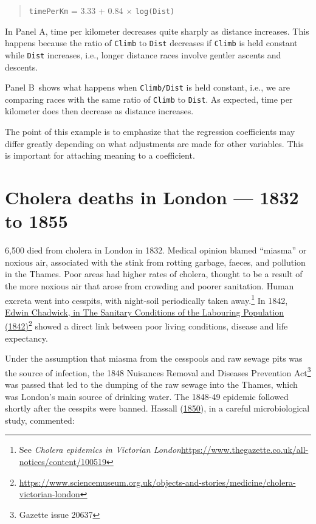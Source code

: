 \documentclass[
  10pt,
  b5paper]{book}
\begin{document}
\begin{quote}
\texttt{timePerKm} = 3.33 + 0.84 \(\times\) \texttt{log(Dist)}
\end{quote}

In Panel A, time per kilometer decreases quite sharply as distance
increases. This happens because the ratio of \texttt{Climb} to \texttt{Dist}
decreases if \texttt{Climb} is held constant while \texttt{Dist} increases,
i.e., longer distance races involve gentler ascents and descents.

Panel B~shows what happens when \texttt{Climb/Dist} is held
constant, i.e., we are comparing races with the same ratio of
\texttt{Climb} to \texttt{Dist}. As expected, time per kilometer does then
decrease as distance increases.

The point of this example is to emphasize that the regression
coefficients may differ greatly depending on what adjustments
are made for other variables. This is important for attaching
meaning to a coefficient.

\hypertarget{cholera-deaths-in-london-1832-to-1855}{%
\section{Cholera deaths in London --- 1832 to 1855}\label{cholera-deaths-in-london-1832-to-1855}}

6,500 died from cholera in London in 1832. Medical opinion
blamed ``miasma'' or noxious air, associated with the stink
from rotting garbage, faeces, and pollution in the Thames.
Poor areas had higher rates of cholera, thought to be a
result of the more noxious air that arose from crowding
and poorer sanitation. Human excreta
went into cesspits, with night-soil periodically taken
away.\footnote{See \emph{Cholera epidemics in Victorian London}\newline \url{https://www.thegazette.co.uk/all-notices/content/100519}}
In 1842, \href{https://www.sciencemuseum.org.uk/objects-and-stories/medicine/cholera-victorian-london}{Edwin Chadwick, in The Sanitary Conditions of the Labouring Population (1842)}\footnote{\url{https://www.sciencemuseum.org.uk/objects-and-stories/medicine/cholera-victorian-london}}
showed a direct link between poor living conditions,
disease and life expectancy.

Under the assumption that miasma from the cesspools and raw
sewage pits was the source of infection, the 1848 Nuisances
Removal and Diseases Prevention Act\footnote{Gazette issue 20637}
was passed that led to the dumping of the raw sewage into
the Thames, which was London's main source of drinking water.
The 1848-49 epidemic followed shortly after the cesspits
were banned. Hassall (\protect\hyperlink{ref-hassall1850memoir}{1850}), in a careful microbiological
study, commented:
\end{document}
